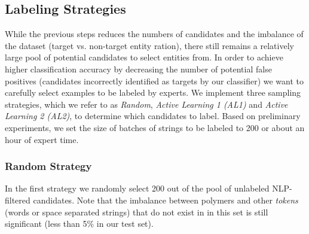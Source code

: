 \subsection{Labeling Strategies}
While the previous steps reduces the numbers of candidates and the imbalance of the dataset (target vs. non-target entity ration), there still remains a relatively large pool of potential candidates to select entities from.
In order to achieve higher classification accuracy\textemdash
by decreasing the number of potential false positives (candidates incorrectly identified as targets by our classifier)
\textemdash we want to carefully select examples to be labeled by experts.
We implement three sampling strategies, which we refer to as \textit{Random}, \textit{Active Learning 1 (AL1)} and \textit{Active Learning 2 (AL2)}, 
to determine which candidates to label.
Based on preliminary experiments, we set the size of batches of strings to be labeled to 200 or about an hour of expert time.

\subsubsection{Random Strategy}
In the first strategy we randomly select 200 out of the pool of unlabeled NLP-filtered candidates.
Note that the imbalance between polymers and other \textit{tokens} (words or space separated strings) that 
do not exist in in this set is still significant (less than 5\% in our test set).

